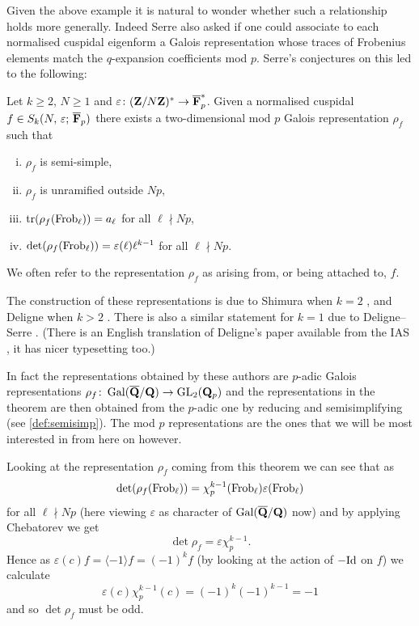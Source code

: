 \documentclass[a4paper,12pt]{article}
\begin{document}
Given the above example it is natural to wonder whether such a relationship holds more generally.
Indeed Serre also asked if one could associate to each normalised cuspidal eigenform a Galois representation whose traces of Frobenius elements match the $q$-expansion coefficients mod $p$.
Serre's conjectures on this led to the following: %

\begin{thm}\label{thm:assoc}
Let $k \ge 2$, $N \ge 1$ and $\varepsilon\colon (\mathbf{Z}/N\mathbf{Z})^* \to \overline{\mathbf{F}}_p^*$. Given a normalised cuspidal $f\in S_k(N,\,\varepsilon;\,\overline{\mathbf{F}}_p)$ there exists a two-dimensional mod $p$ Galois representation $\rho_f$ such that
\begin{enumerate}[(i)]
\item $\rho_f$ is semi-simple,
\item $\rho_f$ is unramified outside $Np$,
\item $\operatorname{tr}(\rho_f (\operatorname{Frob}_\ell)) = a_\ell$ for all $\ell \nmid Np$,
\item $\det(\rho_f (\operatorname{Frob}_\ell)) = \varepsilon(\ell)\ell^{k-1}$ for all $\ell \nmid Np$. %
\end{enumerate}
We often refer to the representation $\rho_f$ as arising from, or being attached to, $f$.
\end{thm}

The construction of these representations is due to Shimura when $k = 2$ \cite{Shimura}, and Deligne when $k > 2$ \cite{Deligne}.
There is also a similar statement for $k = 1$ due to Deligne--Serre \cite{DeligneSerre}.
(There is an English translation of Deligne's paper available from the IAS \cite{DeligneEng}, it has nicer typesetting too.) %

In fact the representations obtained by these authors are $p$-adic Galois representations $\rho_f\colon \operatorname{Gal}(\overline{\mathbf{Q}}/\mathbf{Q}) \to \operatorname{GL}_2(\mathbf{Q}_p)$ and the representations in the theorem are then obtained from the $p$-adic one by reducing and semisimplifying (see \cref{def:semisimp}). %
The mod $p$ representations are the ones that we will be most interested in from here on however.

\begin{rmk}\label{rmk:detrho}
Looking at the representation $\rho_f$ coming from this theorem we can see that as
\[
\det(\rho_f(\operatorname{Frob}_\ell)) = \chi_p^{k-1}(\operatorname{Frob}_\ell)\varepsilon(\operatorname{Frob}_\ell)
\]
for all $\ell \nmid Np$ (here viewing $\varepsilon$ as character of $\operatorname{Gal}(\overline{\mathbf{Q}}/\mathbf{Q})$ now) and by applying Chebatorev we get %
\[
\det\rho_f = \varepsilon\chi_p^{k-1}.
\]
Hence as $\varepsilon(c)f = \langle -1 \rangle f = (-1)^k f$ (by looking at the action of $-\mathrm{Id}$ on $f$) we calculate %
\[
\varepsilon(c)\chi_p^{k-1}(c) = (-1)^k(-1)^{k-1} = -1
\]
and so $\det\rho_f$ must be odd.
\end{rmk}
\end{document}
